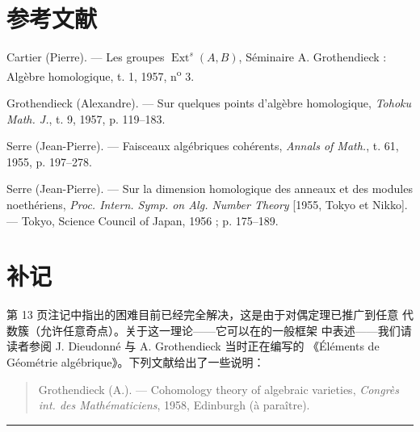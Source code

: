 \section*{参考文献}

\noindent[1] Cartier (Pierre). --- Les groupes
$\operatorname{Ext}^{s}(A,B)$, Séminaire A. Grothendieck : Algèbre homologique,
t. 1, 1957, n\textsuperscript{o} 3.

\noindent[2] Grothendieck (Alexandre). --- Sur quelques points d'algèbre
homologique, \emph{Tohoku Math. J.}, t. 9, 1957, p. 119--183.

\noindent[3] Serre (Jean-Pierre). --- Faisceaux algébriques cohérents,
\emph{Annals of Math.}, t. 61, 1955, p. 197--278.

\noindent[4] Serre (Jean-Pierre). --- Sur la dimension homologique des anneaux
et des modules noethériens, \emph{Proc. Intern. Symp. on Alg. Number Theory}
[1955, Tokyo et Nikko]. --- Tokyo, Science Council of Japan, 1956 ;
p. 175--189.

\clearpage
{}
\section*{补记}

第 13 页注记中指出的困难目前已经完全解决，这是由于对偶定理已推广到任意
代数簇（允许任意奇点）。关于这一理论——它可以在的一般框架
中表述——我们请读者参阅 J. Dieudonné 与 A. Grothendieck 当时正在编写的
《Éléments de Géométrie algébrique》。下列文献给出了一些说明：

\begin{quote}
Grothendieck (A.). --- Cohomology theory of algebraic varieties,
\emph{Congrès int. des Mathématiciens}, 1958, Edinburgh (à paraître).
\end{quote}

\begin{flushright}
[1959年4月]
\end{flushright}

\begin{center}\rule{36mm}{0.5pt}\end{center}

\par
